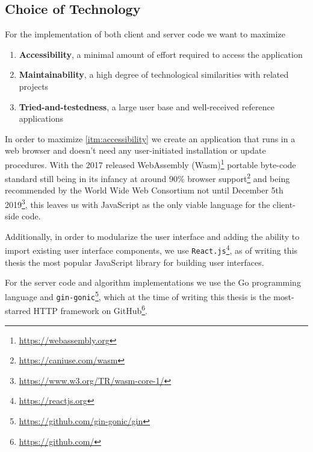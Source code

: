 \subsection{Choice of Technology}

For the implementation of both client and server code we
want to maximize

\begin{enumerate}[label={(\roman*)}]
    \item \label{itm:accessibility} \textbf{Accessibility}, a minimal amount of effort required to access the application
    \item \label{itm:maintainability} \textbf{Maintainability}, a high degree of technological similarities with related projects 
    \item \label{itm:testedness} \textbf{Tried-and-testedness}, a large user base and well-received reference applications
\end{enumerate}

In order to maximize \ref{itm:accessibility} we create an application that runs in a web browser and doesn't need any user-initiated installation or update procedures.
With the 2017 released WebAssembly (Wasm)\footnote{\url{https://webassembly.org}} portable byte-code standard still being in its infancy at around 90\% browser support\footnote{\url{https://caniuse.com/wasm}} and being recommended by the World Wide Web Consortium not until December 5th 2019\footnote{\url{https://www.w3.org/TR/wasm-core-1/}}, this leaves us with JavaScript as the only viable language for the client-side code. 

Additionally, in order to modularize the user interface and adding the ability to import existing user interface components, we use \texttt{React.js}\footnote{\url{https://reactjs.org}}, as of writing this thesis the most popular JavaScript library for building user interfaces.

For the server code and algorithm implementations we use the Go programming language and \texttt{gin-gonic}\footnote{\url{https://github.com/gin-gonic/gin}}, which at the time of writing this thesis is the most-starred HTTP framework on GitHub\footnote{\url{https://github.com/}}.


